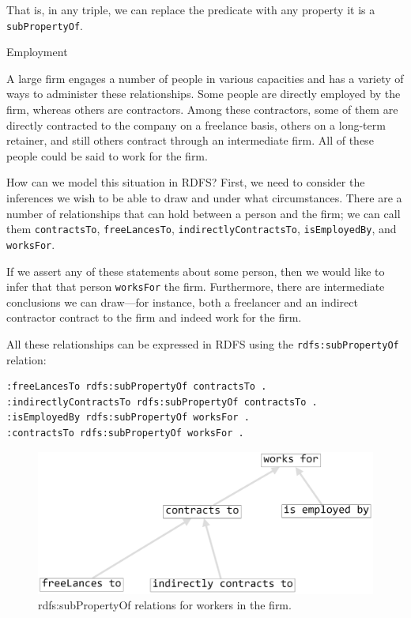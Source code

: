 That is, in any triple, we can replace the predicate with any property
it is a \texttt{subPropertyOf}.

\begin{example}{Employment}

A large firm engages a number of people in various capacities and has a
variety of ways to administer these relationships. Some people are
directly employed by the firm, whereas others are contractors. Among
these contractors, some of them are directly contracted to the company
on a freelance basis, others on a long-term retainer, and still others
contract through an intermediate firm. All of these people could be said
to work for the firm.

How can we model this situation in RDFS? First, we need to consider the
inferences we wish to be able to
draw and under what circumstances. There are a number of relationships
that can hold between a person and the firm; we can call them
\texttt{contractsTo}, \texttt{freeLancesTo}, \texttt{indirectlyContractsTo}, \texttt{isEmployedBy}, and
\texttt{worksFor}.

If we assert any of these statements about some person, then we would
like to infer that that person
\texttt{worksFor} the firm. Furthermore, there are intermediate conclusions we
can draw---for instance, both a freelancer and an indirect contractor
contract to the firm and indeed work for the firm.

All these relationships can be expressed in RDFS using the
\texttt{rdfs:subPropertyOf} relation:

\begin{lstlisting}
:freeLancesTo rdfs:subPropertyOf contractsTo .
:indirectlyContractsTo rdfs:subPropertyOf contractsTo .
:isEmployedBy rdfs:subPropertyOf worksFor .
:contractsTo rdfs:subPropertyOf worksFor .
\end{lstlisting}

\begin{figure}
\centering
\includegraphics[width=5in]{SWWOv3/media/ch8/figure8-1.png}
\caption{rdfs:subPropertyOf relations for workers in the firm.}
\label{fig:ch8.1}
\end{figure}



\end{example}
